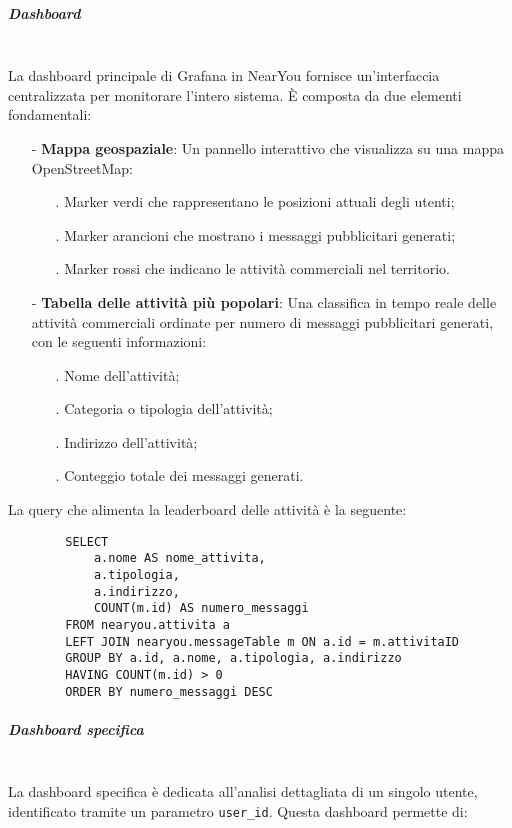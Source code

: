 \documentclass[10pt]{article}
\newcommand{\mysubparagraph}[1]{\subparagraph{#1}\mbox{}\\}
\begin{document}
        \mysubparagraph{Dashboard}
        La dashboard principale di Grafana in NearYou fornisce un'interfaccia centralizzata per monitorare l'intero sistema. È composta da due elementi fondamentali:
        
        \begin{itemize}
            \item[-] \textbf{Mappa geospaziale}: Un pannello interattivo che visualizza su una mappa OpenStreetMap:
            \begin{itemize}
                \item[.] Marker verdi che rappresentano le posizioni attuali degli utenti;
                \item[.] Marker arancioni che mostrano i messaggi pubblicitari generati;
                \item[.] Marker rossi che indicano le attività commerciali nel territorio.
            \end{itemize}
            
            \item[-] \textbf{Tabella delle attività più popolari}: Una classifica in tempo reale delle attività commerciali ordinate per numero di messaggi pubblicitari generati, con le seguenti informazioni:
            \begin{itemize}
                \item[.] Nome dell'attività;
                \item[.] Categoria o tipologia dell'attività;
                \item[.] Indirizzo dell'attività;
                \item[.] Conteggio totale dei messaggi generati.
            \end{itemize}
        \end{itemize}
        
        La query che alimenta la leaderboard delle attività è la seguente:
        \begin{lstlisting}
        SELECT 
            a.nome AS nome_attivita,
            a.tipologia,
            a.indirizzo,
            COUNT(m.id) AS numero_messaggi
        FROM nearyou.attivita a
        LEFT JOIN nearyou.messageTable m ON a.id = m.attivitaID
        GROUP BY a.id, a.nome, a.tipologia, a.indirizzo
        HAVING COUNT(m.id) > 0
        ORDER BY numero_messaggi DESC
        \end{lstlisting}
        
        \mysubparagraph{Dashboard specifica}
        La dashboard specifica è dedicata all'analisi dettagliata di un singolo utente, identificato tramite un parametro \texttt{user\_id}. Questa dashboard permette di:
        
\end{document}
